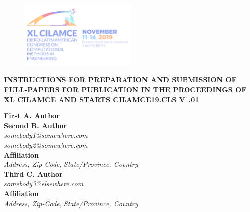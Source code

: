 \documentclass{cilamce19}
\begin{document}


 
\begin{titlepage}
	

	
	\begin{figure}
	\flushright
	\includegraphics[width=2.25in]{clm19_lb.png}
    \end{figure}


 \begin{center}
 	\begin{title}
 		\centering
 		\textbf{INSTRUCTIONS FOR PREPARATION AND SUBMISSION OF FULL-PAPERS FOR PUBLICATION IN THE PROCEEDINGS OF XL CILAMCE AND STARTS CILAMCE19.CLS V1.01}
 	\end{title}	
 \end{center}



\textbf{First A. Author}
\\
\textbf{Second B. Author}
\\
\textit{somebody1@somewhere.com}\\
\textit{somebody2@somewhere.com}
\\
\textbf{Affiliation}
\\
\textit{Address, Zip-Code, State/Province, Country}
\\
\textbf{Third C. Author}
\\
\textit{somebody3@elsewhere.com}\\
\textbf{Affiliation}
\\
\textit{Address, Zip-Code, State/Province, Country}
\\


\end{titlepage}
\end{document}
